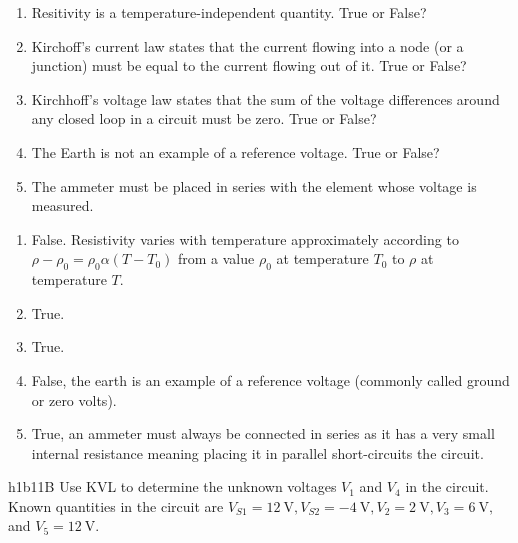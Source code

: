

  \begin{quiz}
    \begin{enumerate}
      \item Resitivity is a temperature-independent quantity. True or False?
      \item Kirchoff's current law states that the current flowing into a node (or a junction) must be equal to the current flowing out of it. True or False?
      \item Kirchhoff's voltage law states that the sum of the voltage differences around any closed loop in a circuit must be zero. True or False?
      \item The Earth is not an example of a reference voltage. True or False?
      \item The ammeter must be placed in series with the element whose voltage is measured.
    \end{enumerate}
  \end{quiz}

  {\color{AUred}
  \begin{answers}
    \begin{enumerate}
      \item False. Resistivity varies with temperature approximately according to $\rho - \rho_0 = \rho_0 \alpha (T - T_0)$ from a value $\rho_0$ at temperature $T_0$ to $\rho$ at temperature $T$.
      \item True.
      \item True.
      \item False, the earth is an example of a reference voltage (commonly called ground or zero volts).
      \item True, an ammeter must always be connected in series as it has a very small internal resistance meaning placing it in parallel short-circuits the circuit. 
    \end{enumerate}
  \end{answers}
}

  \begin{problemwithimage}{h1b1}{1B}
    Use KVL to determine the unknown voltages $V_1$ and $V_4$ in the circuit.
    Known quantities in the circuit are $V_{S1} = \qty{12}{\V} , V_{S2} = \qty{-4}{\V}, V_2 = \qty{2}{\V}, V_3 = \qty{6}{\V},$ and $V_5 = \qty{12}{\V}$.
  \end{problemwithimage}

